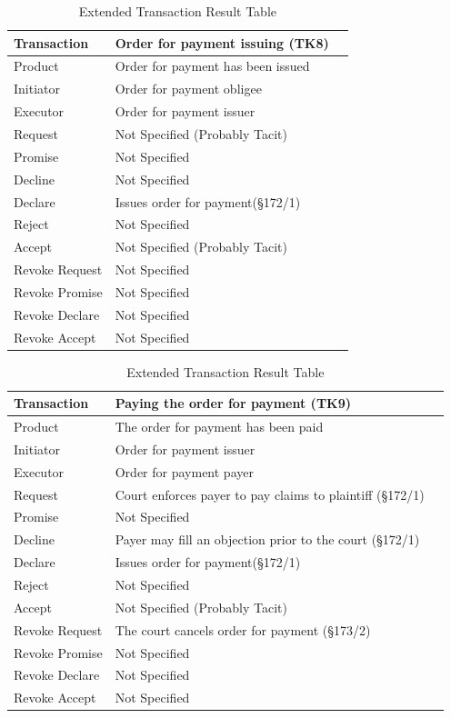 \begin{landscape}
\begin{table}[h]
\caption{Extended Transaction Result Table}
\label{tab:etrt}
\begin{tabular}{|l||l|l|}
\hline
Transaction  &  Order for payment issuing (TK8) \\ \hline
Product      &  Order for payment has been issued \\ \hline
Initiator      &  Order for payment obligee \\ \hline
Executor       &  Order for payment issuer \\ \hline
Request        &   Not Specified (Probably Tacit)  \\ \hline
Promise        &    Not Specified   \\ \hline
Decline        &  Not Specified   \\ \hline
Declare        &  Issues order for payment(\S172/1)  \\ \hline
Reject         &  Not Specified   \\ \hline
Accept         & Not Specified (Probably Tacit) \\ \hline
Revoke Request & Not Specified       \\ \hline
Revoke Promise & Not Specified  \\ \hline
Revoke Declare & Not Specified      \\ \hline
Revoke Accept  &  Not Specified \\ \hline
\end{tabular}
\end{table}

\begin{table}[h]
\caption{Extended Transaction Result Table}
\label{tab:etrt}
\begin{tabular}{|l||l|l|}
\hline
Transaction  &  Paying the order for payment (TK9) \\ \hline
Product      &  The order for payment has been paid \\ \hline
Initiator      &  Order for payment issuer \\ \hline
Executor       &  Order for payment payer \\ \hline
Request        &    Court enforces payer to pay claims to plaintiff (\S172/1)
  \\ \hline
Promise        &    Not Specified   \\ \hline
Decline        &  Payer may fill an objection prior to the court (\S172/1)  \\ \hline
Declare        &  Issues order for payment(\S172/1)  \\ \hline
Reject         &  Not Specified   \\ \hline
Accept         & Not Specified (Probably Tacit) \\ \hline
Revoke Request & The court cancels order for payment (\S173/2)       \\ \hline
Revoke Promise & Not Specified  \\ \hline
Revoke Declare & Not Specified      \\ \hline
Revoke Accept  &  Not Specified \\ \hline
\end{tabular}
\end{table}


\end{landscape}

